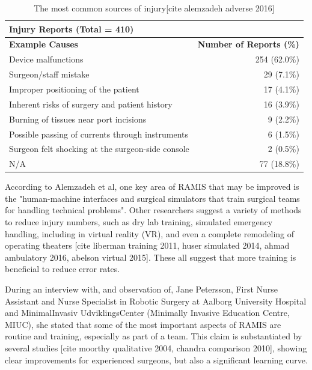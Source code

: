 \documentclass[conference]{IEEEtran}
\begin{document}
\begin{table}[H]
\centering
\begin{tabular}{@{}lr@{}}
\toprule
\multicolumn{2}{l}{\textbf{Injury Reports (Total = 410)}}                           \\ \midrule
\textbf{Example Causes}                           & \textbf{Number of Reports (\%)} \\ \midrule
Device malfunctions                               & 254 (62.0\%)                    \\
Surgeon/staff mistake                             & 29 (7.1\%)                      \\
Improper positioning of the patient               & 17 (4.1\%)                      \\
Inherent risks of surgery and patient history     & 16 (3.9\%)                      \\
Burning of tissues near port incisions            & 9 (2.2\%)                       \\
Possible passing of currents through instruments           & 6 (1.5\%)                       \\
Surgeon felt shocking at the surgeon-side console & 2 (0.5\%)                       \\
N/A                                               & 77 (18.8\%)                     \\ \toprule
\end{tabular}
\caption{The most common sources of injury[cite alemzadeh adverse 2016]}
\label{tab:Alam}
\end{table}

According to Alemzadeh et al, one key area of RAMIS that may be improved is the "human-machine interfaces and surgical simulators that train surgical teams for handling technical problems". Other researchers suggest a variety of methods to reduce injury numbers, such as dry lab training, simulated emergency handling, including in virtual reality (VR), and even a complete remodeling of operating theaters [cite liberman training 2011, huser simulated 2014, ahmad ambulatory 2016, abelson virtual 2015]. These all suggest that more training is beneficial to reduce error rates.

During an interview with, and observation of, Jane Petersson, First Nurse Assistant and Nurse Specialist in Robotic Surgery at Aalborg University Hospital and MinimalInvasiv UdviklingsCenter (Minimally Invasive Education Centre, MIUC), she stated that some of the most important aspects of RAMIS are routine and training, especially as part of a team. This claim is substantiated by several studies [cite moorthy qualitative 2004, chandra comparison 2010], showing clear improvements for experienced surgeons, but also a significant learning curve.
\end{document}
